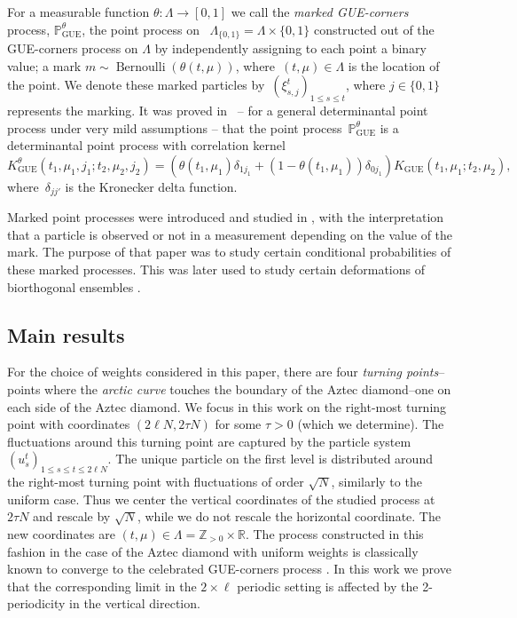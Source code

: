 \documentclass[11pt]{article}
\theoremstyle{plain}
\theoremstyle{definition}
\numberwithin{equation}{section}
\newcommand{\ZZ}{\mathbb{Z}}
\newcommand{\RR}{\mathbb{R}}
\newcommand{\PP}{\mathbb{P}}
\begin{document}
For a measurable function $\theta:\Lambda\rightarrow [0,1]$ we call the \textit{marked GUE-corners} process, $\PP_{\operatorname{GUE}}^\theta$, the point process on ~$\Lambda_{\{0,1\}}=\Lambda \times \{0,1\}$ constructed out of the GUE-corners process on $\Lambda$ by independently assigning to each point a binary value; a mark $m\sim \operatorname{Bernoulli}(\theta(t,\mu))$, where~$(t,\mu)\in \Lambda$ is the location of the point. We denote these marked particles by~$(\xi_{s,j}^t)_{1\leq s\leq t}$, where $j\in \{0,1\}$ represents the marking.
%
It was proved in~\cite{CG23} -- for a general determinantal point process under very mild assumptions -- that the point process~$\PP_{\operatorname{GUE}}^\theta$ is a determinantal point process with correlation kernel
\begin{equation}\label{eq:intro:marked_kernel}
K_{\operatorname{GUE}}^\theta(t_1,\mu_1,j_1;t_2,\mu_2,j_2)=\left(\theta(t_1,\mu_1)\delta_{1j_1}+(1-\theta(t_1,\mu_1))\delta_{0j_1}\right)K_{\operatorname{GUE}}(t_1,\mu_1;t_2,\mu_2),
\end{equation}
where~$\delta_{jj'}$ is the Kronecker delta function. 

Marked point processes were introduced and studied in \cite{CG23}, with the interpretation that a particle is observed or not in a measurement depending on the value of the mark. The purpose of that paper was to study certain conditional probabilities of these marked processes. This was later used to study certain deformations of biorthogonal ensembles \cite{CS25}. 

\subsection{Main results}\label{sec:intro:main_results}
For the choice of weights considered in this paper, there are four \emph{turning points}--points where the \emph{arctic curve} touches the boundary of the Aztec diamond--one on each side of the Aztec diamond. We focus in this work on the right-most turning point with coordinates $(2\ell N, 2 \tau N)$ for some $\tau>0$ (which we determine). The fluctuations around this turning point are captured by the particle system~$(u_{s}^t)_{1\leq s\leq t\leq 2\ell N}$. 
%
The unique particle on the first level is distributed around the right-most turning point with fluctuations of order $\sqrt{N}$, similarly to the uniform case. Thus we center the vertical coordinates of the studied process at $2\tau N$ and rescale by $\sqrt{N}$, while we do not rescale the horizontal coordinate. The new coordinates are $(t,\mu)\in \Lambda=\ZZ_{>0}\times \RR$. The process constructed in this fashion in the case of the Aztec diamond with uniform weights is classically known to converge to the celebrated GUE-corners process \cite{JN06}. 
In this work we prove that the corresponding limit in the $2\times \ell$ periodic setting is affected by the 2-periodicity in the vertical direction. 
\end{document}
